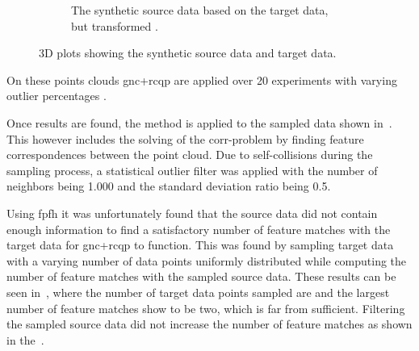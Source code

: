 \begin{figure}[!h]
\begin{subfigure}[b]{0.48\textwidth}
		\caption{The synthetic source data based on the target data, but transformed .}
		\label{fig:synthetic-target-data}
	\end{subfigure}
	\caption{3D plots showing the synthetic source data and target data.}
	\label{fig:synthetic-source-and-target-data}
\end{figure}

On these points clouds \gls{gnc}+\gls{rcqp} are applied over \num{20} experiments with varying outlier percentages . \medskip

Once results are found, the method is applied to the sampled data shown in~. This however includes the solving of the \gls{corr-problem} by finding feature correspondences between the point cloud. Due to self-collisions during the sampling process, a statistical outlier filter was applied with the number of neighbors  being \num{1,000} and the standard deviation ratio \mvar{\sigma} being \num{0.5}.\medskip

Using \gls{fpfh} it was unfortunately found that the source data did not contain enough information to find a satisfactory number of feature matches with the target data for \gls{gnc}+\gls{rcqp} to function. This was found by sampling target data with a varying number of data points uniformly distributed while computing the number of feature matches with the sampled source data. These results can be seen in~, where the number of target data points sampled are  and the largest number of feature matches show to be two, which is far from sufficient. Filtering the sampled source data did not increase the number of feature matches as shown in the~.

